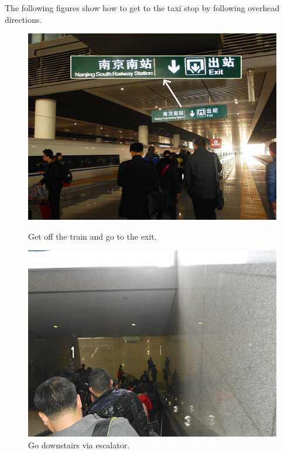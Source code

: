 \documentclass[11pt]{article}
\begin{document}
The following figures show how to get to the taxi stop by following overhead directions. 
\begin{figure}[!h]
	\begin{minipage}[t]{.5\textwidth}
     	\centering
        	\includegraphics{image053.jpg}
		\caption{Get off the train and go to the exit.}
	\end{minipage}%
     \begin{minipage}[t]{.5\textwidth}
         \centering
         \includegraphics{image055.jpg}
		\caption{Go downstairs via escalator.}
    \end{minipage}%
 \end{figure}
\end{document}
